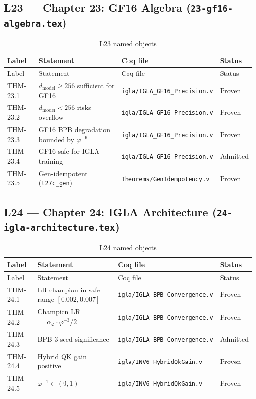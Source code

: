 \subsection{L23 — Chapter 23: GF16 Algebra
  (\texttt{23-gf16-algebra.tex})}
\label{sec:A-L23}

\begin{longtable}{lp{6cm}ll}
\toprule
Label & Statement & Coq file & Status \\
\midrule
\endfirsthead
\toprule
Label & Statement & Coq file & Status \\
\midrule
\endhead
\bottomrule
\endfoot
\bottomrule
\caption{L23 named objects}
\endlastfoot
THM-23.1 & $d_{\text{model}} \geq 256$ sufficient for GF16 &
  \texttt{igla/IGLA\_GF16\_Precision.v} & Proven \\
THM-23.2 & $d_{\text{model}} < 256$ risks overflow &
  \texttt{igla/IGLA\_GF16\_Precision.v} & Proven \\
THM-23.3 & GF16 BPB degradation bounded by $\varphi^{-6}$ &
  \texttt{igla/IGLA\_GF16\_Precision.v} & Proven \\
THM-23.4 & GF16 safe for IGLA training &
  \texttt{igla/IGLA\_GF16\_Precision.v} & Admitted \\
THM-23.5 & Gen-idempotent (\texttt{t27c\_gen}) &
  \texttt{Theorems/GenIdempotency.v} & Proven \\
\end{longtable}

\subsection{L24 — Chapter 24: IGLA Architecture
  (\texttt{24-igla-architecture.tex})}
\label{sec:A-L24}

\begin{longtable}{lp{6cm}ll}
\toprule
Label & Statement & Coq file & Status \\
\midrule
\endfirsthead
\toprule
Label & Statement & Coq file & Status \\
\midrule
\endhead
\bottomrule
\endfoot
\bottomrule
\caption{L24 named objects}
\endlastfoot
THM-24.1 & LR champion in safe range $[0.002,0.007]$ &
  \texttt{igla/IGLA\_BPB\_Convergence.v} & Proven \\
THM-24.2 & Champion LR $= \alpha_{\varphi}\cdot\varphi^{-3}/2$ &
  \texttt{igla/IGLA\_BPB\_Convergence.v} & Proven \\
THM-24.3 & BPB 3-seed significance &
  \texttt{igla/IGLA\_BPB\_Convergence.v} & Admitted \\
THM-24.4 & Hybrid QK gain positive &
  \texttt{igla/INV6\_HybridQkGain.v} & Proven \\
THM-24.5 & $\varphi^{-1} \in (0,1)$ &
  \texttt{igla/INV6\_HybridQkGain.v} & Proven \\
\end{longtable}

